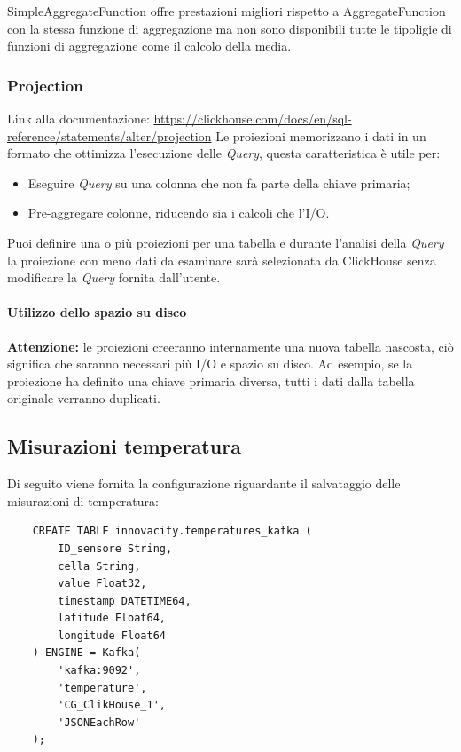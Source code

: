 SimpleAggregateFunction offre prestazioni migliori rispetto a AggregateFunction con la stessa funzione di aggregazione ma non sono disponibili tutte le tipoligie di funzioni di aggregazione come il calcolo della media.


    
\subsubsection{Projection}\label{sec:projections}
Link alla documentazione: \href{https://clickhouse.com/docs/en/sql-reference/statements/alter/projection}{https://clickhouse.com/docs/en/sql-reference/statements/alter/projection}\newline
Le proiezioni memorizzano i dati in un formato che ottimizza l'esecuzione delle \textit{Query}, questa caratteristica è utile per:

\begin{itemize}
    \item Eseguire \textit{Query} su una colonna che non fa parte della chiave primaria;
    \item Pre-aggregare colonne, riducendo sia i calcoli che l'I/O.
\end{itemize}

Puoi definire una o più proiezioni per una tabella e durante l'analisi della \textit{Query} la proiezione con meno dati da esaminare sarà selezionata da ClickHouse senza modificare la \textit{Query} fornita dall'utente.

\paragraph*{Utilizzo dello spazio su disco}
\textbf{Attenzione:} le proiezioni creeranno internamente una nuova tabella nascosta, ciò significa che saranno necessari più I/O e spazio su disco. Ad esempio, se la proiezione ha definito una chiave primaria diversa, tutti i dati dalla tabella originale verranno duplicati.

\subsection{Misurazioni temperatura}
Di seguito viene fornita la configurazione riguardante il salvataggio delle misurazioni di temperatura:

\begin{verbatim}
    CREATE TABLE innovacity.temperatures_kafka (
        ID_sensore String,
        cella String,
        value Float32,
        timestamp DATETIME64,
        latitude Float64,
        longitude Float64
    ) ENGINE = Kafka(
        'kafka:9092',
        'temperature',
        'CG_ClikHouse_1',
        'JSONEachRow'
    );
    \end{verbatim}

